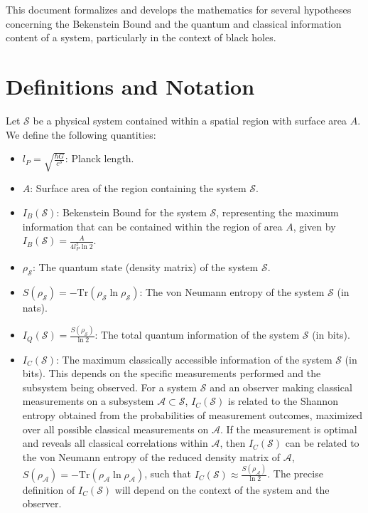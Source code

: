 











	
	
		This document formalizes and develops the mathematics for several hypotheses concerning the Bekenstein Bound and the quantum and classical information content of a system, particularly in the context of black holes.

	
	\section{Definitions and Notation}
	
	Let $\mathcal{S}$ be a physical system contained within a spatial region with surface area $A$. We define the following quantities:
	\begin{itemize}
		\item $l_P = \sqrt{\frac{\hbar G}{c^3}}$: Planck length.
		\item $A$: Surface area of the region containing the system $\mathcal{S}$.
		\item $I_B(\mathcal{S})$: Bekenstein Bound for the system $\mathcal{S}$, representing the maximum information that can be contained within the region of area $A$, given by $I_B(\mathcal{S}) = \frac{A}{4 l_P^2 \ln 2}$.
		\item $\rho_{\mathcal{S}}$: The quantum state (density matrix) of the system $\mathcal{S}$.
		\item $S(\rho_{\mathcal{S}}) = -\text{Tr}(\rho_{\mathcal{S}} \ln \rho_{\mathcal{S}})$: The von Neumann entropy of the system $\mathcal{S}$ (in nats).
		\item $I_Q(\mathcal{S}) = \frac{S(\rho_{\mathcal{S}})}{\ln 2}$: The total quantum information of the system $\mathcal{S}$ (in bits).
		\item $I_C(\mathcal{S})$: The maximum classically accessible information of the system $\mathcal{S}$ (in bits). This depends on the specific measurements performed and the subsystem being observed. For a system $\mathcal{S}$ and an observer making classical measurements on a subsystem $\mathcal{A} \subset \mathcal{S}$, $I_C(\mathcal{S})$ is related to the Shannon entropy obtained from the probabilities of measurement outcomes, maximized over all possible classical measurements on $\mathcal{A}$. If the measurement is optimal and reveals all classical correlations within $\mathcal{A}$, then $I_C(\mathcal{S})$ can be related to the von Neumann entropy of the reduced density matrix of $\mathcal{A}$, $S(\rho_{\mathcal{A}}) = -\text{Tr}(\rho_{\mathcal{A}} \ln \rho_{\mathcal{A}})$, such that $I_C(\mathcal{S}) \approx \frac{S(\rho_{\mathcal{A}})}{\ln 2}$. The precise definition of $I_C(\mathcal{S})$ will depend on the context of the system and the observer.
	\end{itemize}
	
